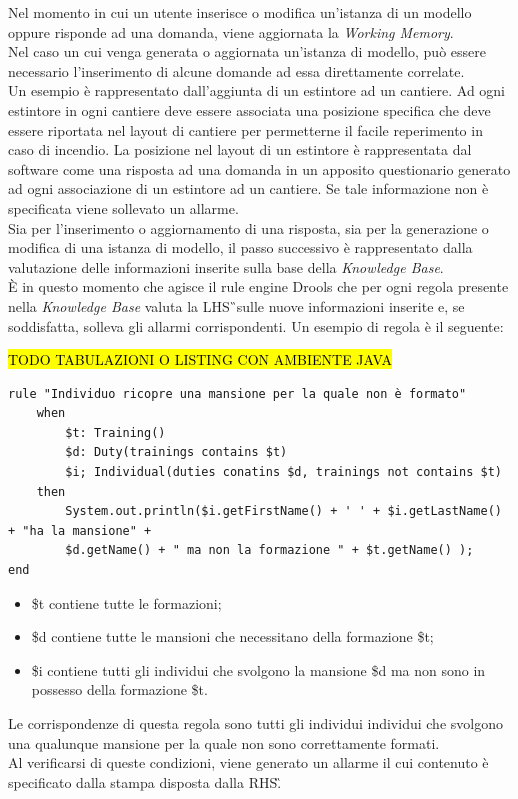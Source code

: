 Nel momento in cui un utente inserisce o modifica un'istanza di un modello oppure risponde ad una domanda, viene aggiornata la \textit{Working Memory}. \\
Nel caso un cui venga generata o aggiornata un'istanza di modello, può essere necessario l'inserimento di alcune domande ad essa direttamente correlate.\\
Un esempio è rappresentato dall'aggiunta di un estintore ad un cantiere. Ad ogni estintore in ogni cantiere deve essere associata una posizione specifica che deve essere riportata nel layout di cantiere per permetterne il facile reperimento in caso di incendio. La posizione nel layout di un estintore è rappresentata dal software come una risposta ad una domanda in un apposito questionario generato ad ogni associazione di un estintore ad un cantiere. Se tale informazione non è specificata viene sollevato un allarme.\\
Sia per l'inserimento o aggiornamento di una risposta, sia per la generazione o modifica di una istanza di modello, il passo successivo è rappresentato dalla valutazione delle informazioni inserite sulla base della \textit{Knowledge Base}. \\
È in questo momento che agisce il rule engine Drools che per ogni regola presente nella \textit{Knowledge Base} valuta la \gls{LHS}\G\ sulle nuove informazioni inserite e, se soddisfatta, solleva gli allarmi corrispondenti. 
Un esempio di regola è il seguente:

\hl{TODO TABULAZIONI O LISTING CON AMBIENTE JAVA}
\begin{verbatim}
rule "Individuo ricopre una mansione per la quale non è formato"
	when
		$t: Training()
		$d: Duty(trainings contains $t)
		$i; Individual(duties conatins $d, trainings not contains $t)
	then
		System.out.println($i.getFirstName() + ' ' + $i.getLastName() + "ha la mansione" +
		$d.getName() + " ma non la formazione " + $t.getName() );
end
\end{verbatim}
\begin{itemize}
	\item \$t contiene tutte le formazioni;
	\item \$d contiene  tutte le mansioni che necessitano della formazione \$t;
	\item \$i contiene tutti gli individui che svolgono la mansione \$d ma non sono in possesso della formazione \$t.
\end{itemize}
Le corrispondenze di questa regola sono tutti gli individui individui che svolgono una qualunque mansione per la quale non sono correttamente formati.\\
Al verificarsi di queste condizioni, viene generato un allarme il cui contenuto è specificato dalla stampa disposta dalla \gls{RHS}\G.



